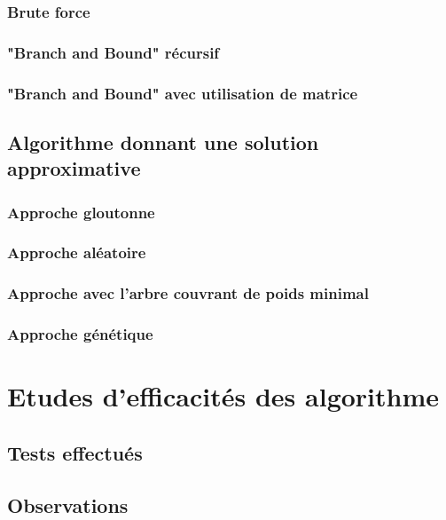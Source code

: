 \documentclass[10pt,a4paper]{report}
\begin{document}
		\subsubsection{Brute force}
		
		\subsubsection{"Branch and Bound" récursif}	
		
		\subsubsection{"Branch and Bound" avec utilisation de matrice}	
		
	\subsection{Algorithme donnant une solution approximative}
	
		\subsubsection{Approche gloutonne}
		
		\subsubsection{Approche aléatoire}
		
		\subsubsection{Approche avec l'arbre couvrant de poids minimal}
		
		\subsubsection{Approche génétique}
		
\section{Etudes d'efficacités des algorithme}

	\subsection{Tests effectués}
	
	\subsection{Observations}
	
\end{document}

